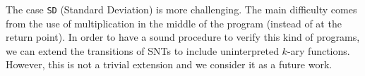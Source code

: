 






The case \texttt{SD} (Standard Deviation) is more challenging. The main difficulty comes from the use of multiplication in the middle of the program (instead of at the return point). In order to have a sound procedure to verify this kind of programs, we can extend the transitions of SNTs to include uninterpreted $k$-ary functions. However, this is not a trivial extension and we consider it as a future work.


